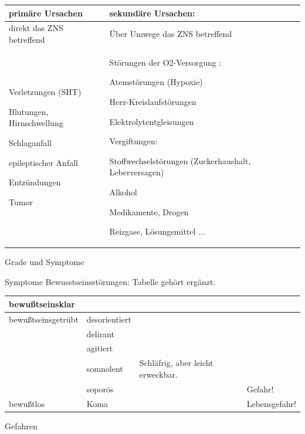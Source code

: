 \documentclass{article}
\begin{document}
\begin{center}
\tablehead{}\begin{supertabular}{|m{6.649cm}|m{6.651cm}|}
\hline
\centering prim\"are  Ursachen\par

 &
\centering sekund\"are  Ursachen:\par

\\\hline
direkt das ZNS betreffend

 &
\"Uber Umwege das ZNS betreffend

\\\hline
Verletzungen (SHT)

Blutungen, Hirnschwellung

Schlaganfall

epileptischer Anfall

Entz\"undungen

Tumor

 &
St\"orungen der O2-Versorgung :

Atemst\"orungen  (Hypoxie)

Herz-Kreislaufst\"orungen

Elektrolytentgleisungen

Vergiftungen:

Stoffwechselst\"orungen (Zuckerhaushalt, Leberversagen)

Alkohol

Medikamente, Drogen

Reizgase,  L\"osungsmittel ...

\\\hline
\end{supertabular}
\end{center}
Grade und Symptome

Symptome Bewusstseinsst\"orungen: Tabelle geh\"ort erg\"anzt.%
%


\begin{center}
\tablehead{}\begin{supertabular}{|m{3.225cm}|m{3.225cm}|m{3.225cm}|m{3.225cm}|}
\hline
bewu{\ss}tseinsklar

 &
 &
 &
\\\hline
bewu{\ss}tseinsgetr\"ubt

 &
desorientiert

 &
 &
\\\hline
 &
delirant

 &
 &
\\\hline
 &
agitiert

 &
 &
\\\hline
 &
somnolent

 &
Schl\"afrig, aber leicht erweckbar. 

 &
\\\hline
 &
sopor\"os

 &
 &
Gefahr!

\\\hline
bewu{\ss}tlos

 &
Koma

 &
 &
Lebensgefahr! 

\\\hline
\end{supertabular}
\end{center}
Gefahren
\end{document}
